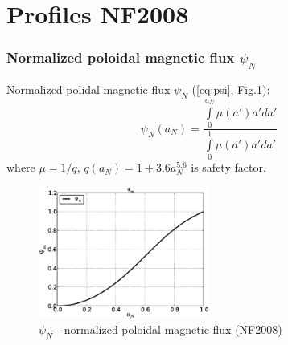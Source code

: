 \documentclass[11pt,oneside,a4paper,notitlepage]{article}
\begin{document}
\tableofcontents

\part{Profiles NF2008}

\section{Normalized poloidal magnetic flux $\psi_N$}
Normalized polidal magnetic flux $\psi_N$ (\ref{eq:psi}, Fig.\ref{fig:Flux}):
\begin{equation}\label{eq:psi}
 \psi_N(a_N)=\dfrac{\int\limits_0^{a_N} \mu(a')a'da'}{\int\limits_0^{1} \mu(a')a'da'}
\end{equation}
where $\mu=1/q$, $q(a_N)=1+3.6a_N^{5.6}$ is safety factor.
\begin{figure}[h] 
 \centering
 \includegraphics[width=0.5\textwidth]{Flux.eps}
 \caption{$\psi_N$ - normalized poloidal magnetic flux (NF2008)} 
 \label{fig:Flux}
\end{figure}
\end{document}
